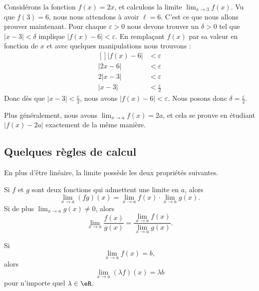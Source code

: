 \begin{example}
	Considérons la fonction $f(x)=2x$, et calculons la limite $\lim_{x\to 3} f(x)$. Vu que $f(3)=6$, nous nous attendons à avoir $\ell=6$. C'est ce que nous allons prouver maintenant. Pour chaque $\varepsilon>0$ nous devons trouver un $\delta>0$ tel que $| x-3 |<\delta$ implique $| f(x)-6 |<\varepsilon$. En remplaçant $f(x)$ par sa valeur en fonction de $x$ et avec quelques manipulations nous trouvons :
	\begin{equation}
		\begin{aligned}[]
			| f(x)-6 |&<\varepsilon\\
			| 2x-6 |&<\varepsilon\\
			2| x-3 |&<\varepsilon\\
			| x-3 |&<\frac{ \varepsilon }{2}
		\end{aligned}
	\end{equation}
	Donc dès que $| x-3 |<\frac{ \varepsilon }{2}$, nous avons $| f(x)-6 |<\varepsilon$. Nous posons donc $\delta=\frac{ \varepsilon }{2}$.

	Plus généralement, nous avons $\lim_{x\to a} f(x)=2a$, et cela se prouve en étudiant $| f(x)-2a |$ exactement de la même manière.
\end{example}

\subsection{Quelques règles de calcul}


En plus d'être linéaire, la limite possède les deux propriétés suivantes.
\begin{proposition}     \label{PROPooDQFIooMMwxxJ}
	Si $f$ et $g$ sont deux fonctions qui admettent une limite en $a$, alors
	\begin{equation}
		\lim_{x\to a} (fg)(x)=\lim_{x\to a} f(x)\cdot\lim_{x\to a} g(x).
	\end{equation}
	Si de plus $\lim_{x\to a} g(x)\neq 0$, alors
	\begin{equation}
		\lim_{x\to a} \frac{ f(x) }{ g(x) }=\frac{ \lim_{x\to a} f(x) }{ \lim_{x\to a} g(x) }.
	\end{equation}
\end{proposition}

\begin{theorem}     \label{ThoLimLinMul}
    Si
    \begin{equation} \label{Eqhypmullimlin}
      \lim_{x\to a}f(x)=b,
    \end{equation}
    alors
    \begin{equation} \label{Eqbutmultlim}
      \lim_{x\to a}(\lambda f)(x)=\lambda b
    \end{equation}
    pour n'importe quel $\lambda\in\eR$.
\end{theorem}


